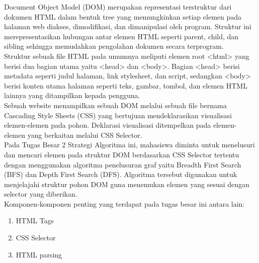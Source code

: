 \documentclass[12pt,a4paper]{article}
\begin{document}
Document Object Model (DOM) merupakan representasi terstruktur dari dokumen HTML dalam bentuk tree yang 
memungkinkan setiap elemen pada halaman web diakses, dimodifikasi, dan dimanipulasi oleh program. 
Struktur ini merepresentasikan hubungan antar elemen HTML seperti 
parent, child, dan sibling sehingga memudahkan pengolahan dokumen secara terprogram. \\

Struktur sebuah file HTML pada umumnya meliputi elemen root <html> yang berisi dua bagian utama yaitu <head> dan <body>. 
Bagian <head> berisi metadata seperti judul halaman, link stylesheet, dan script, sedangkan <body> berisi konten utama halaman 
seperti teks, gambar, tombol, dan elemen HTML lainnya yang ditampilkan kepada pengguna. \\

Sebuah website menampilkan sebuah DOM melalui sebuah file bernama Cascading Style Sheets (CSS) yang bertujuan mendeklarasikan visualisasi elemen-elemen pada pohon. 
Deklarasi visualisasi ditempelkan pada elemen-elemen yang berkaitan melalui CSS Selector. \\

Pada Tugas Besar 2 Strategi Algoritma ini, mahasiswa diminta untuk menelusuri dan mencari elemen pada struktur DOM berdasarkan CSS Selector tertentu dengan menggunakan algoritma penelusuran graf yaitu Breadth First Search (BFS) dan Depth First Search (DFS). 
Algoritma tersebut digunakan untuk menjelajahi struktur pohon DOM guna menemukan elemen yang sesuai dengan selector yang diberikan. \\

Komponen-komponen penting yang terdapat pada tugas besar ini antara lain:
\begin{enumerate}
    \item HTML Tags
    \item CSS Selector
    \item HTML parsing
\end{enumerate} \\
\end{document}
